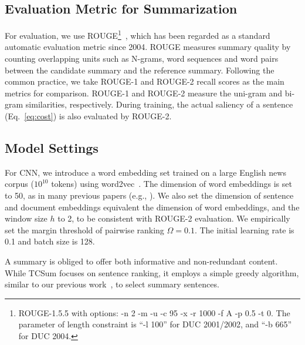 \documentclass[letterpaper]{article}
\begin{document}
\subsection{Evaluation Metric for Summarization}
For evaluation, we use ROUGE\footnote{ROUGE-1.5.5 with options: -n 2 -m -u -c 95 -x -r 1000 -f A -p 0.5 -t 0. The parameter of length constraint is ``-l 100'' for DUC 2001/2002, and ``-b 665'' for DUC 2004.}~\cite{lin2004rouge}, which has been regarded as a standard automatic evaluation metric since 2004.
ROUGE measures summary quality by counting overlapping units such as N-grams, word sequences and word pairs between the candidate summary and the reference summary.
Following the common practice, we take ROUGE-1 and ROUGE-2 recall scores as the main metrics for comparison.
ROUGE-1 and ROUGE-2 measure the uni-gram and bi-gram similarities, respectively.
During training, the actual saliency of a sentence (Eq.~\ref{eq:cost}) is also evaluated by ROUGE-2.

\subsection{Model Settings}
For CNN, we introduce a word embedding set trained on a large English news corpus ($10^{10}$ tokens) using word2vec~\cite{mikolov2013efficient}.
The dimension of word embeddings is set to 50, as in many previous papers (e.g.,  \cite{Collobert2011}).
We also set the dimension of sentence and document embeddings equivalent the dimension of word embeddings, and the window size $h$ to 2, to be consistent with ROUGE-2 evaluation.
We empirically set the margin threshold of pairwise ranking $\Omega=0.1$.
The initial learning rate is 0.1 and batch size is 128.

A summary is obliged to offer both informative and non-redundant content.
While TCSum focuses on sentence ranking, it employs a simple greedy algorithm, similar to our previous work~\cite{cao2016attsum}, to select summary sentences.
\end{document}
